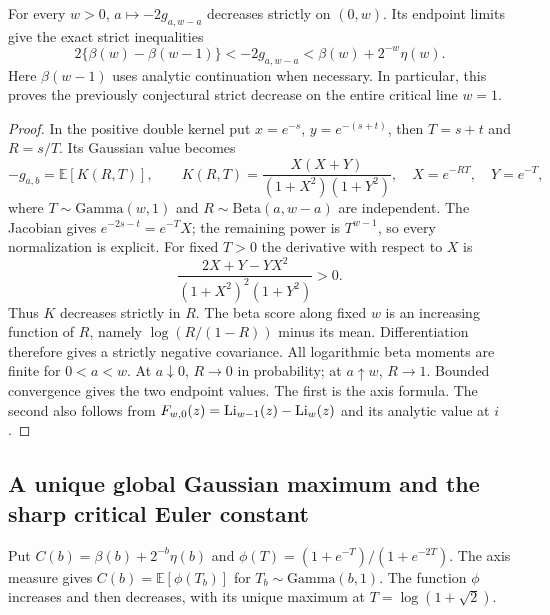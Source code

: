 \begin{theorem}
\label{subpick:thm:fixed-total}
For every $w>0$, $a\mapsto-2g_{a,w-a}$ decreases strictly on $(0,w)$.
Its endpoint limits give the exact strict inequalities
\[
 2\{\beta(w)-\beta(w-1)\}
 <-2g_{a,w-a}<\beta(w)+2^{-w}\eta(w).
\]
Here $\beta(w-1)$ uses analytic continuation when necessary.
In particular, this proves the previously conjectural strict decrease
on the entire critical line $w=1$.
\end{theorem}
\begin{proof}
In the positive double kernel put $x=e^{-s}$, $y=e^{-(s+t)}$,
then $T=s+t$ and $R=s/T$. Its Gaussian value becomes
\[
 -g_{a,b}=\mathbb E[K(R,T)],\qquad
 K(R,T)=\frac{X(X+Y)}{(1+X^2)(1+Y^2)},\quad
 X=e^{-RT},\quad Y=e^{-T},
\]
where $T\sim\mathrm{Gamma}(w,1)$ and $R\sim\mathrm{Beta}(a,w-a)$
are independent. The Jacobian gives $e^{-2s-t}=e^{-T}X$;
the remaining power is $T^{w-1}$, so every normalization is explicit.
For fixed $T>0$ the derivative with respect to $X$ is
\[
 \frac{2X+Y-YX^2}{(1+X^2)^2(1+Y^2)}>0.
\]
Thus $K$ decreases strictly in $R$. The beta score along fixed $w$
is an increasing function of $R$, namely $\log(R/(1-R))$ minus
its mean. Differentiation therefore gives a strictly negative covariance.
All logarithmic beta moments are finite for $0<a<w$.
At $a\downarrow0$, $R\to0$ in probability; at $a\uparrow w$,
$R\to1$. Bounded convergence gives the two endpoint values. The
first is the axis formula. The second also follows from
$F_{w,0}(z)=\operatorname{Li}_{w-1}(z)-\operatorname{Li}_w(z)$ and its analytic value at $i$.
\end{proof}

\subsection{A unique global Gaussian maximum and the sharp critical Euler constant}
Put $C(b)=\beta(b)+2^{-b}\eta(b)$ and
$\phi(T)=(1+e^{-T})/(1+e^{-2T})$.
The axis measure gives $C(b)=\mathbb E[\phi(T_b)]$ for
$T_b\sim\mathrm{Gamma}(b,1)$. The function $\phi$ increases and then
decreases, with its unique maximum at $T=\log(1+\sqrt2)$.

